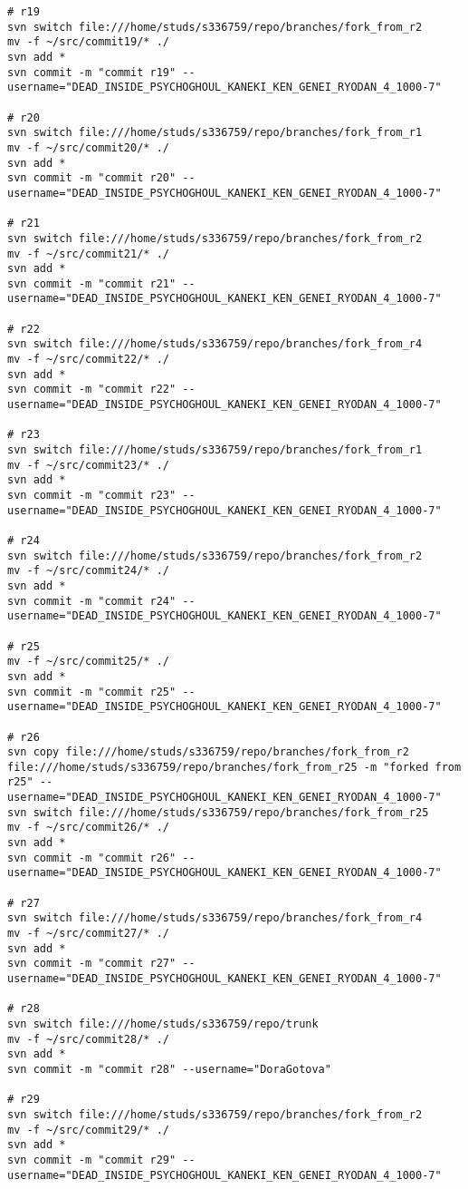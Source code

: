 \begin{verbatim}
# r19
svn switch file:///home/studs/s336759/repo/branches/fork_from_r2
mv -f ~/src/commit19/* ./
svn add *
svn commit -m "commit r19" --username="DEAD_INSIDE_PSYCHOGHOUL_KANEKI_KEN_GENEI_RYODAN_4_1000-7"

# r20
svn switch file:///home/studs/s336759/repo/branches/fork_from_r1
mv -f ~/src/commit20/* ./
svn add *
svn commit -m "commit r20" --username="DEAD_INSIDE_PSYCHOGHOUL_KANEKI_KEN_GENEI_RYODAN_4_1000-7"

# r21
svn switch file:///home/studs/s336759/repo/branches/fork_from_r2
mv -f ~/src/commit21/* ./
svn add *
svn commit -m "commit r21" --username="DEAD_INSIDE_PSYCHOGHOUL_KANEKI_KEN_GENEI_RYODAN_4_1000-7"

# r22
svn switch file:///home/studs/s336759/repo/branches/fork_from_r4
mv -f ~/src/commit22/* ./
svn add *
svn commit -m "commit r22" --username="DEAD_INSIDE_PSYCHOGHOUL_KANEKI_KEN_GENEI_RYODAN_4_1000-7"

# r23
svn switch file:///home/studs/s336759/repo/branches/fork_from_r1
mv -f ~/src/commit23/* ./
svn add *
svn commit -m "commit r23" --username="DEAD_INSIDE_PSYCHOGHOUL_KANEKI_KEN_GENEI_RYODAN_4_1000-7"

# r24
svn switch file:///home/studs/s336759/repo/branches/fork_from_r2
mv -f ~/src/commit24/* ./
svn add *
svn commit -m "commit r24" --username="DEAD_INSIDE_PSYCHOGHOUL_KANEKI_KEN_GENEI_RYODAN_4_1000-7"

# r25
mv -f ~/src/commit25/* ./
svn add *
svn commit -m "commit r25" --username="DEAD_INSIDE_PSYCHOGHOUL_KANEKI_KEN_GENEI_RYODAN_4_1000-7"

# r26
svn copy file:///home/studs/s336759/repo/branches/fork_from_r2 file:///home/studs/s336759/repo/branches/fork_from_r25 -m "forked from r25" --username="DEAD_INSIDE_PSYCHOGHOUL_KANEKI_KEN_GENEI_RYODAN_4_1000-7"
svn switch file:///home/studs/s336759/repo/branches/fork_from_r25
mv -f ~/src/commit26/* ./
svn add *
svn commit -m "commit r26" --username="DEAD_INSIDE_PSYCHOGHOUL_KANEKI_KEN_GENEI_RYODAN_4_1000-7"

# r27
svn switch file:///home/studs/s336759/repo/branches/fork_from_r4
mv -f ~/src/commit27/* ./
svn add *
svn commit -m "commit r27" --username="DEAD_INSIDE_PSYCHOGHOUL_KANEKI_KEN_GENEI_RYODAN_4_1000-7"

# r28
svn switch file:///home/studs/s336759/repo/trunk
mv -f ~/src/commit28/* ./
svn add *
svn commit -m "commit r28" --username="DoraGotova"

# r29
svn switch file:///home/studs/s336759/repo/branches/fork_from_r2
mv -f ~/src/commit29/* ./
svn add *
svn commit -m "commit r29" --username="DEAD_INSIDE_PSYCHOGHOUL_KANEKI_KEN_GENEI_RYODAN_4_1000-7"


\end{verbatim}
